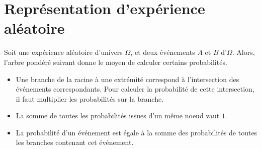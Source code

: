 \documentclass{article}
\begin{document}
\section{Représentation d'expérience aléatoire}
\begin{example}
Soit une expérience aléatoire d'univers $\Omega$, et deux événements $A$ et $B$ d'$\Omega$. Alors, l'arbre pondéré suivant donne le moyen de calculer certains probabilités.
\begin{center}
\end{center}
\end{example}
\begin{tcolorbox}
\begin{proposition}
\hfill
\begin{itemize}
\item Une branche de la racine à une extrémité correspond à l'intersection des événements correspondants. Pour calculer la probabilité de cette intersection, il faut multiplier les probabilités sur la branche.
\item La somme de toutes les probabilités issues d'un même noeud vaut $1$.
\item La probabilité d'un événement est égale à la somme des probabilités de toutes les branches contenant cet événement. 
\end{itemize}        
\end{proposition}
\end{tcolorbox}

\newpage
\end{document}
